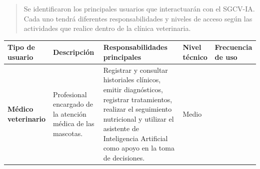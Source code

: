\documentclass[
]{article}
\newcounter{none} %
\begin{document}
\begin{quote}
Se identificaron los principales usuarios que interactuarán con el
SGCV-IA. Cada uno tendrá diferentes responsabilidades y niveles de
acceso según las actividades que realice dentro de la clínica
veterinaria.
\end{quote}

{\def\LTcaptype{none} %
\begin{longtable}[]{|
  >{\raggedright\arraybackslash}p{}|
  >{\raggedright\arraybackslash}p{}|
  >{\raggedright\arraybackslash}p{}|
  >{\raggedright\arraybackslash}p{}|
  >{\raggedright\arraybackslash}p{}|}
\hline
\begin{minipage}[b]{\linewidth}\centering
\textbf{Tipo de usuario}
\end{minipage} & \begin{minipage}[b]{\linewidth}\raggedright
\textbf{Descripción}
\end{minipage} & \begin{minipage}[b]{\linewidth}\raggedright
\textbf{Responsabilidades principales}
\end{minipage} & \begin{minipage}[b]{\linewidth}\raggedright
\textbf{Nivel técnico}
\end{minipage} & \begin{minipage}[b]{\linewidth}\raggedright
\textbf{Frecuencia de uso}
\end{minipage} \\
\hline
\endhead
\hline
\endlastfoot
\textbf{Médico veterinario} &
\begin{minipage}[t]{\linewidth}\raggedright
Profesional encargado de la atención médica de las mascotas.
\end{minipage} & \begin{minipage}[t]{\linewidth}\raggedright
Registrar y consultar historiales clínicos, emitir diagnósticos,
registrar tratamientos, realizar el seguimiento nutricional y utilizar
el asistente de Inteligencia Artificial como apoyo en la toma de decisiones.
\end{minipage} & \begin{minipage}[t]{\linewidth}\raggedright
Medio
\end{minipage} & \begin{minipage}[t]{\linewidth}\raggedright

\end{minipage}
\end{longtable}}
\end{document}

